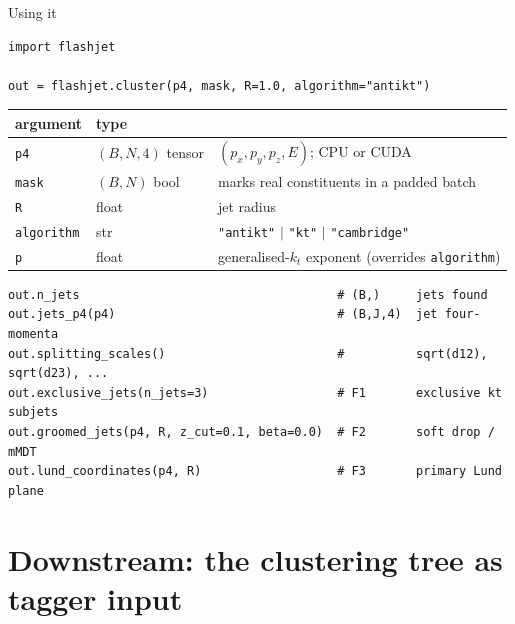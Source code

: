 \documentclass[aspectratio=169,10pt]{beamer}
\begin{document}
\begin{frame}[fragile]{Using it}
\begin{Verbatim}[fontsize=\footnotesize,frame=single,rulecolor=\color{fjgray}]
import flashjet

out = flashjet.cluster(p4, mask, R=1.0, algorithm="antikt")
\end{Verbatim}
\vspace{-0.3em}
{\footnotesize
\begin{tabular}{@{}lll@{}}
\toprule
\textbf{argument} & \textbf{type} & \\
\midrule
\texttt{p4} & $(B,N,4)$ tensor & $(p_x,p_y,p_z,E)$; CPU or CUDA\\
\texttt{mask} & $(B,N)$ bool & marks real constituents in a padded batch\\
\texttt{R} & float & jet radius\\
\texttt{algorithm} & str & \texttt{"antikt"} $\vert$ \texttt{"kt"} $\vert$ \texttt{"cambridge"}\\
\texttt{p} & float & generalised-$k_t$ exponent (overrides \texttt{algorithm})\\
\bottomrule
\end{tabular}}
\medskip

\begin{Verbatim}[fontsize=\footnotesize,frame=single,rulecolor=\color{fjgray}]
out.n_jets                                    # (B,)     jets found
out.jets_p4(p4)                               # (B,J,4)  jet four-momenta
out.splitting_scales()                        #          sqrt(d12), sqrt(d23), ...
out.exclusive_jets(n_jets=3)                  # F1       exclusive kt subjets
out.groomed_jets(p4, R, z_cut=0.1, beta=0.0)  # F2       soft drop / mMDT
out.lund_coordinates(p4, R)                   # F3       primary Lund plane
\end{Verbatim}
\end{frame}

\section{Downstream: the clustering tree as tagger input}
\end{document}
